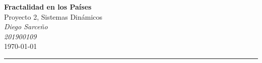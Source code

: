



%
%
%






\textcolor{DS_Black}{
\begin{minipage}{0.85\textwidth}
    \begin{center}
        \textbf{\Large Fractalidad en los Países}\\
        \vspace{5pt}
        Proyecto 2, Sistemas Dinámicos \\
        \vspace{20pt}
        \textit{Diego Sarceño} \\
        \vspace{5pt}
        \footnotesize{\textit{201900109}} \\
        \vspace{5pt}
        \today
    \end{center}
\end{minipage}
\vspace{10pt}
\hrule
}